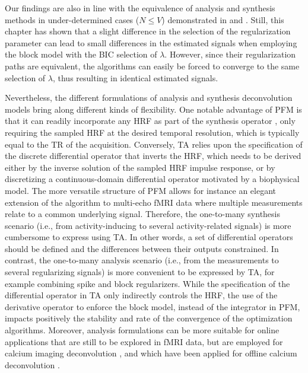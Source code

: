 Our findings are also in line with the equivalence of analysis and synthesis
methods in under-determined cases (\(N \leq V\)) demonstrated in
\citep{Elad2007Analysisversussynthesis} and
\citep{Ortelli2019Synthesisanalysistotal}. Still, this chapter has shown that a
slight difference in the selection of the regularization parameter can lead to
small differences in the estimated signals when employing the block model with
the BIC selection of $\lambda$. However, since their regularization
paths are equivalent, the algorithms can easily be forced to converge to the
same selection of $\lambda$, thus resulting in identical estimated signals.

Nevertheless, the different formulations of analysis and synthesis deconvolution
models bring along different kinds of flexibility. One notable advantage of PFM
is that it can readily incorporate any HRF as part of the synthesis operator
\citep{Elad2007Analysisversussynthesis}, only requiring the sampled HRF at the
desired temporal resolution, which is typically equal to the TR of the
acquisition. Conversely, TA relies upon the specification of the discrete
differential operator that inverts the HRF, which needs to be derived either by
the inverse solution of the sampled HRF impulse response, or by discretizing a
continuous-domain differential operator motivated by a biophysical model. The
more versatile structure of PFM allows for instance an elegant extension of the
algorithm to multi-echo fMRI data
\citep{CaballeroGaudes2019deconvolutionalgorithmmulti} where multiple
measurements relate to a common underlying signal. Therefore, the one-to-many
synthesis scenario (i.e., from activity-inducing to several activity-related
signals) is more cumbersome to express using TA. In other words, a set of
differential operators should be defined and the differences between their
outputs constrained. In contrast, the one-to-many analysis scenario (i.e., from
the measurements to several regularizing signals) is more convenient to be
expressed by TA, for example combining spike and block regularizers. While the
specification of the differential operator in TA only indirectly controls the
HRF, the use of the derivative operator to enforce the block model, instead of
the integrator in PFM, impacts positively the stability and rate of the
convergence of the optimization algorithms. Moreover, analysis formulations can
be more suitable for online applications that are still to be explored in fMRI
data, but are employed for calcium imaging deconvolution
\citep{Friedrich2017Fastonlinedeconvolution,Jewell2019Fastnonconvexdeconvolution},
and which have been applied for offline calcium deconvolution
\citep{Farouj2020DeconvolutionSustainedNeural}.

